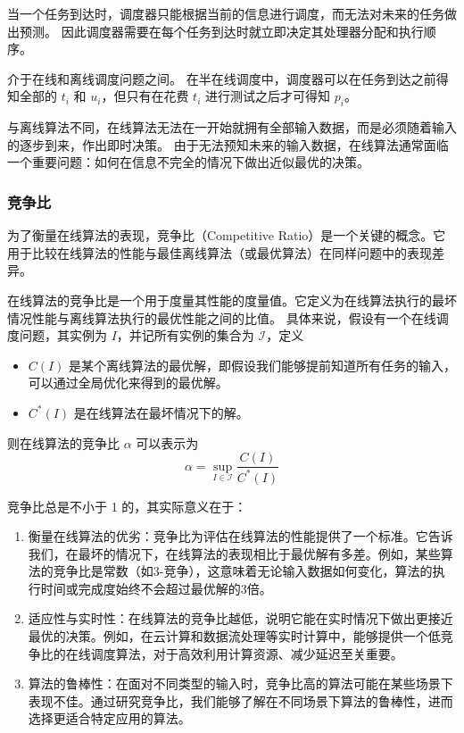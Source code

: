 \begin{defi}[在线带测试多处理器调度问题]
    当一个任务到达时，调度器只能根据当前的信息进行调度，而无法对未来的任务做出预测。
    因此调度器需要在每个任务到达时就立即决定其处理器分配和执行顺序。
\end{defi}

\begin{defi}[半在线带测试多处理器调度问题]
    介于在线和离线调度问题之间。
    在半在线调度中，调度器可以在任务到达之前得知全部的 $t_i$ 和 $u_i$，但只有在花费 $t_i$ 进行测试之后才可得知 $p_i$。
\end{defi}

与离线算法不同，在线算法无法在一开始就拥有全部输入数据，而是必须随着输入的逐步到来，作出即时决策。
由于无法预知未来的输入数据，在线算法通常面临一个重要问题：如何在信息不完全的情况下做出近似最优的决策。

\subsubsection{竞争比}

为了衡量在线算法的表现，竞争比（Competitive Ratio）是一个关键的概念。它用于比较在线算法的性能与最佳离线算法（或最优算法）在同样问题中的表现差异。

\begin{defi}
    在线算法的竞争比是一个用于度量其性能的度量值。它定义为在线算法执行的最坏情况性能与离线算法执行的最优性能之间的比值。
    具体来说，假设有一个在线调度问题，其实例为 $I$，并记所有实例的集合为 $\mathcal{I}$，定义

    \begin{itemize}
        \item $C(I)$ 是某个离线算法的最优解，即假设我们能够提前知道所有任务的输入，可以通过全局优化来得到的最优解。
        \item $C^*(I)$ 是在线算法在最坏情况下的解。
    \end{itemize}
    则在线算法的竞争比 $\alpha$ 可以表示为
    \[
        \alpha = \sup_{I\in \mathcal{I}} \dfrac{C(I)}{C^*(I)}
    \]
\end{defi}

竞争比总是不小于 1 的，其实际意义在于：
\begin{enumerate}
    \item 衡量在线算法的优劣：竞争比为评估在线算法的性能提供了一个标准。它告诉我们，在最坏的情况下，在线算法的表现相比于最优解有多差。例如，某些算法的竞争比是常数（如3-竞争），这意味着无论输入数据如何变化，算法的执行时间或完成度始终不会超过最优解的3倍。
    \item 适应性与实时性：在线算法的竞争比越低，说明它能在实时情况下做出更接近最优的决策。例如，在云计算和数据流处理等实时计算中，能够提供一个低竞争比的在线调度算法，对于高效利用计算资源、减少延迟至关重要。
    \item 算法的鲁棒性：在面对不同类型的输入时，竞争比高的算法可能在某些场景下表现不佳。通过研究竞争比，我们能够了解在不同场景下算法的鲁棒性，进而选择更适合特定应用的算法。
\end{enumerate}

